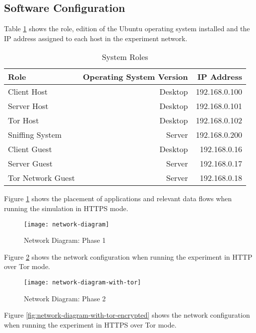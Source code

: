 \subsection{Software Configuration}

Table \ref{table:hosts} shows the role, edition of the Ubuntu operating system
installed and the IP address assigned to each host in the experiment network.

\begin{table}[H]
  \begin{tabular}{lrr}
    \toprule
    Role & Operating System Version & IP Address\\
    \midrule
    Client Host & Desktop & 192.168.0.100\\
    Server Host & Desktop & 192.168.0.101\\
    Tor Host & Desktop & 192.168.0.102\\
    \midrule
    Sniffing System & Server & 192.168.0.200\\
    \midrule
    Client Guest & Desktop & 192.168.0.16\\
    Server Guest & Server & 192.168.0.17\\
    Tor Network Guest & Server & 192.168.0.18\\
    \bottomrule
  \end{tabular}
  \caption{System Roles}
  \label{table:hosts}
\end{table}

Figure \ref{fig:network-diagram} shows the placement of applications and relevant
data flows when running the simulation in HTTPS mode.

\begin{figure}[H]
  \centering\texttt{[image: network-diagram]}
  \caption{Network Diagram: Phase 1}
  \label{fig:network-diagram}
\end{figure}

Figure \ref{fig:network-diagram-with-tor} shows the network configuration when
running the experiment in HTTP over Tor mode.

\begin{figure}[H]
  \centering\texttt{[image: network-diagram-with-tor]}
  \caption{Network Diagram: Phase 2}
  \label{fig:network-diagram-with-tor}
\end{figure}

Figure \ref{fig:network-diagram-with-tor-encrypted} shows the network configuration when
running the experiment in HTTPS over Tor mode.

